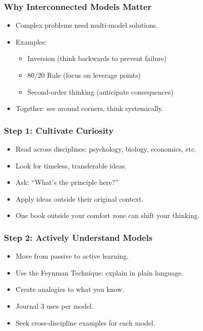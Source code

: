 \begin{frame}[fragile]\frametitle{Why Interconnected Models Matter}
  \begin{itemize}
    \item Complex problems need multi-model solutions.
    \item Examples:
      \begin{itemize}
        \item Inversion (think backwards to prevent failure)
        \item 80/20 Rule (focus on leverage points)
        \item Second-order thinking (anticipate consequences)
      \end{itemize}
    \item Together: see around corners, think systemically.
  \end{itemize}
\end{frame}

\begin{frame}[fragile]\frametitle{Step 1: Cultivate Curiosity}
  \begin{itemize}
    \item Read across disciplines: psychology, biology, economics, etc.
    \item Look for timeless, transferable ideas.
    \item Ask: ``What's the principle here?''
    \item Apply ideas outside their original context.
    \item One book outside your comfort zone can shift your thinking.
  \end{itemize}
\end{frame}

\begin{frame}[fragile]\frametitle{Step 2: Actively Understand Models}
  \begin{itemize}
    \item Move from passive to active learning.
    \item Use the Feynman Technique: explain in plain language.
    \item Create analogies to what you know.
    \item Journal 3 uses per model.
    \item Seek cross-discipline examples for each model.
  \end{itemize}
\end{frame}

